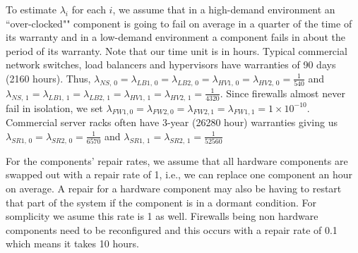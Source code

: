 \documentclass[12pt]{article}
\begin{document}
To estimate $\lambda_i$ for each $i$, we assume that in a high-demand
environment an ``over-clocked"" component is going to fail on average in a
quarter of the time of its warranty and in a low-demand environment a
component fails in about the period of its warranty. Note that our time unit
is in hours. Typical commercial network switches, load balancers and
hypervisors have warranties of 90 days (2160 hours). Thus, $\lambda_{NS, \, 0}
= \lambda_{LB1, \, 0} = \lambda_{LB2, \, 0} = \lambda_{HV1, \, 0} =
\lambda_{HV2, \, 0} = \frac{1}{540} $ and $\lambda_{NS, \, 1} = \lambda_{LB1,
\, 1} = \lambda_{LB2, \, 1} = \lambda_{HV1, \, 1} = \lambda_{HV2, \, 1} =
\frac{1}{4320}$. Since firewalls almost never fail in isolation, we set
$\lambda_{FW1, 0} = \lambda_{FW2, 0} = \lambda_{FW2, 1} = \lambda_{FW1, 1} = 1
\times 10^{-10}$. Commercial server racks often have 3-year (26280 hour)
warranties giving us $\lambda_{SR1, \, 0} = \lambda_{SR2, \, 0} =
\frac{1}{6570}$ and $\lambda_{SR1, \, 1} = \lambda_{SR2, \, 1} =
\frac{1}{52560}$

For the components' repair rates, we assume that all hardware components are
swapped out with a repair rate of 1, i.e., we can replace one component an
hour on average. A repair for a hardware component may also be having to
restart that part of the system if the component is in a dormant condition.
For somplicity we asume this rate is 1 as well. Firewalls being non hardware
components need to be reconfigured and this occurs with a repair rate of 0.1
which means it takes 10 hours.



\end{document}
